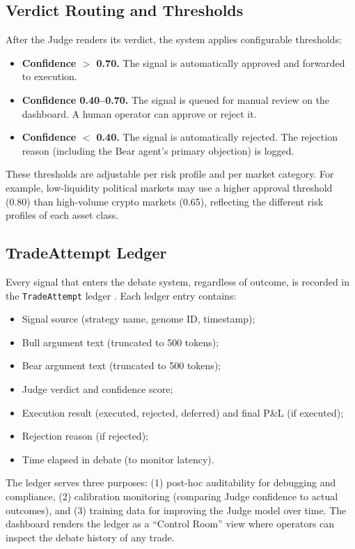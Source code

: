\subsection{Verdict Routing and Thresholds}

After the Judge renders its verdict, the system applies configurable thresholds:
\begin{itemize}
    \item \textbf{Confidence $>$ 0.70.} The signal is automatically approved and forwarded to execution.
    \item \textbf{Confidence 0.40--0.70.} The signal is queued for manual review on the dashboard. A human operator can approve or reject it.
    \item \textbf{Confidence $<$ 0.40.} The signal is automatically rejected. The rejection reason (including the Bear agent's primary objection) is logged.
\end{itemize}

These thresholds are adjustable per risk profile and per market category. For example, low-liquidity political markets may use a higher approval threshold (0.80) than high-volume crypto markets (0.65), reflecting the different risk profiles of each asset class.

\subsection{TradeAttempt Ledger}

Every signal that enters the debate system, regardless of outcome, is recorded in the \texttt{TradeAttempt} ledger \citep{nygard2018release}. Each ledger entry contains:
\begin{itemize}
    \item Signal source (strategy name, genome ID, timestamp);
    \item Bull argument text (truncated to 500 tokens);
    \item Bear argument text (truncated to 500 tokens);
    \item Judge verdict and confidence score;
    \item Execution result (executed, rejected, deferred) and final P\&L (if executed);
    \item Rejection reason (if rejected);
    \item Time elapsed in debate (to monitor latency).
\end{itemize}

The ledger serves three purposes: (1) post-hoc auditability for debugging and compliance, (2) calibration monitoring (comparing Judge confidence to actual outcomes), and (3) training data for improving the Judge model over time. The dashboard renders the ledger as a ``Control Room'' view where operators can inspect the debate history of any trade.

